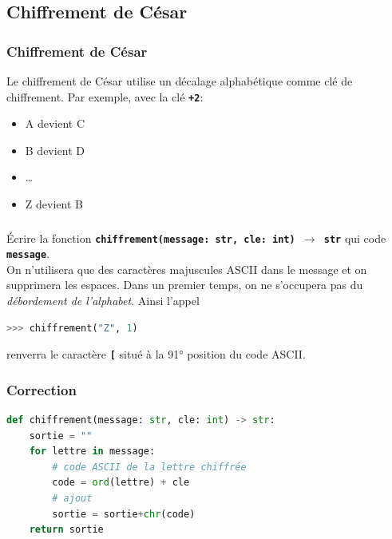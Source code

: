 \documentclass[svgnames,11pt]{beamer}
\begin{document}
\subsection{Chiffrement de César}
\begin{frame}
    \frametitle{Chiffrement de César}

    Le chiffrement de César utilise un décalage alphabétique comme clé de chiffrement. Par exemple, avec la clé \textbf{\texttt{+2}}:
    \begin{itemize}
        \item A devient C
        \item B devient D
        \item \dots
        \item Z devient B
    \end{itemize}

\end{frame}
\begin{frame}[fragile]
    \frametitle{}
    
    \begin{activite}
        Écrire la fonction \textbf{\texttt{chiffrement(message: str, cle: int) $\rightarrow$ str}} qui code \textbf{\texttt{message}}. \\
        On n'utilisera que des caractères majuscules ASCII dans le message et on supprimera les espaces.     Dans un premier temps, on ne s'occupera pas du \emph{débordement de l'alphabet}. Ainsi l'appel
\begin{center}
\begin{lstlisting}[language=Python , basicstyle=\ttfamily\small, xleftmargin=2em, xrightmargin=2em]
>>> chiffrement("Z", 1)
\end{lstlisting}
\end{center}
renverra le caractère \textbf{\texttt{[}} situé à la 91° position du code ASCII.
    \end{activite}

\end{frame}
\begin{frame}[fragile]
    \frametitle{Correction}

\begin{center}
\begin{lstlisting}[language=Python , basicstyle=\ttfamily\small, xleftmargin=0.2em, xrightmargin=0em]
def chiffrement(message: str, cle: int) -> str:
    sortie = ""
    for lettre in message:
        # code ASCII de la lettre chiffrée
        code = ord(lettre) + cle
        # ajout
        sortie = sortie+chr(code)
    return sortie
\end{lstlisting}
\end{center}

\end{frame}
\end{document}
